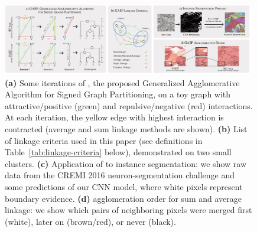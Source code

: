 
\begin{figure}[t]
\centering
\includegraphics[width=0.98\textwidth]{figs/intro_image_v5.pdf} %
\caption{\textbf{(a)} Some iterations of \algname{}, the proposed Generalized Agglomerative Algorithm for Signed Graph Partitioning, on a toy graph with attractive/positive (green) and repulsive/negative (red) interactions. At each iteration, the yellow edge with highest interaction is contracted (average and sum linkage methods are shown). \textbf{(b)} List of linkage criteria used in this paper (see definitions in Table~\ref{tab:linkage-criteria} below), demonstrated on two small clusters.  \textbf{(c)} Application of \algname{} to instance segmentation: we show raw data from the CREMI 2016 neuron-segmentation challenge and some predictions of our CNN model, where white pixels represent boundary evidence. \textbf{(d)} \algname{} agglomeration order for sum and average linkage: we show which pairs of neighboring pixels were merged first (white), later on (brown/red), or never (black).
\label{fig:intro_figure}}
\end{figure}

